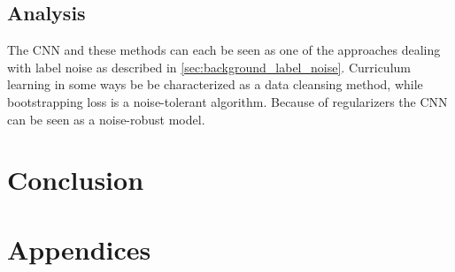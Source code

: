\documentclass[a4paper]{book}
\begin{document}






\section{Analysis}
The \ac{CNN} and these methods can each be seen as one of the approaches dealing with label noise as described in \ref{sec:background_label_noise}. Curriculum learning in some ways be be characterized as a data cleansing method, while bootstrapping loss is a noise-tolerant algorithm. Because of regularizers the \ac{CNN} can be seen as a noise-robust model. 

\chapter{Conclusion}
\label{cha:evaluationAndConclusion}







\backmatter


\appendix
\chapter*{Appendices}
\renewcommand{\thesection}{\Alph{section}}




\end{document}
